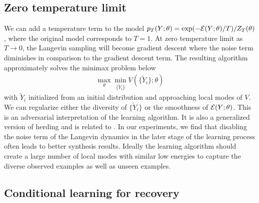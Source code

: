 \documentclass[10pt,twocolumn,letterpaper]{article}
\def\E{{\rm E}}
\def\KL{{\rm KL}}
\def\tY{\tilde{Y}}
\begin{document}
\subsection{Zero temperature limit} 


We can add a temperature term to the model $p_T(Y; \theta) = \exp(- {\cal E}(Y; \theta)/T)/Z_T(\theta)$, where the original model corresponds to $T = 1$. At zero temperature limit as $T \rightarrow 0$, the Langevin sampling will become gradient descent where the noise term diminishes in comparison to the gradient descent term. The resulting algorithm approximately solves the minimax problem below
  \begin{eqnarray} 
\max_{\theta} \min_{\{\tY_i\}}  V(\{\tY_i\}; \theta)  \label{eq:minimax}
\end{eqnarray}
with $\tY_i$ initialized from an initial distribution and approaching local modes of $V$.  We can regularize either the diversity of $\{\tY_i\}$ or the smoothness of ${\cal E}(Y; \theta)$.  This is an adversarial interpretation of the learning algorithm. It is also a generalized version of herding \cite{welling2009herding} and is related to \cite{arjovsky2017wasserstein}. In our experiments, we find that disabling the noise term of the Langevin dynamics in the later stage of the learning process often leads to better synthesis results.  Ideally the learning algorithm should create a large number of local modes with similar low energies to capture the diverse observed examples as well as unseen examples. 


\subsection{Conditional learning for recovery}
\end{document}
